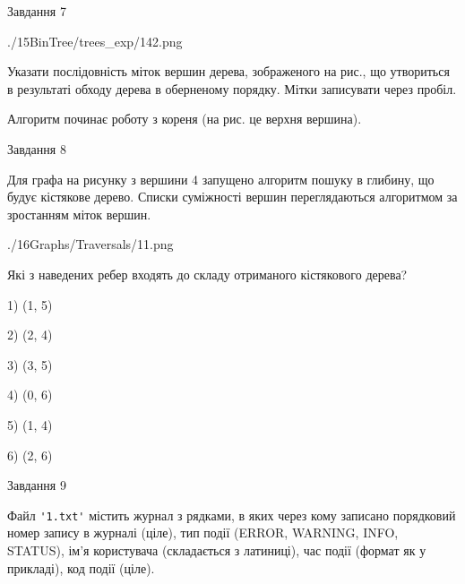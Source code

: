 \documentclass[12pt, ukrainian]{article}
\def\code#1{\Verb!#1!}
\begin{document}
{\vspace{10mm}\par

\newpage
\begin{minipage}[t]{9.7cm}
               
{\begin{center}Завдання {7}\end{center}}
\vspace{-6mm}

\begin{center}
	{./15BinTree/trees_exp/142.png}
\end{center}
Указати послідовність міток вершин дерева, зображеного на рис., що утвориться в результаті обходу дерева в оберненому порядку. Мітки записувати через пробіл.\par Алгоритм починає роботу з кореня (на рис. це верхня вершина).\par

\end{minipage}
\vline \hspace{8mm}
\begin{minipage}[t]{8.0cm}
               
{\begin{center}Завдання {8}\end{center}}
\vspace{-6mm}
Для графа на рисунку з вершини 4 запущено алгоритм пошуку в глибину, що будує кістякове дерево. Списки суміжності вершин переглядаються алгоритмом за зростанням міток вершин.\par
\begin{center}
	{./16Graphs/Traversals/11.png}
\end{center}
\par Які з наведених ребер входять до складу отриманого кістякового дерева?\par
1) (1, 5)\par
2) (2, 4)\par
3) (3, 5)\par
4) (0, 6)\par
5) (1, 4)\par
6) (2, 6)\par
{\vskip 15pt} \par

\end{minipage}

               
{\begin{center}Завдання {9}\end{center}}
\vspace{-6mm}
Файл \code{'1.txt'} містить журнал з рядками, в яких через кому записано поряд\-ко\-вий номер запису в журналі (ціле), тип події (ERROR, WARNING, INFO, STATUS), ім'я користувача (складається з латиниці), час події (фор\-мат як у прикладі), код події (ціле).

}
\end{document}
